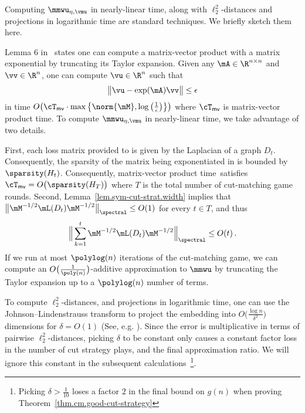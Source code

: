 \documentclass[letterpaper]{article}
\begin{document}
Computing $\mmwu_{\eta, \vmu}$ in nearly-linear time, along with $\ell_2^2$-distances and projections in logarithmic time are standard techniques. We briefly sketch them here.

Lemma 6 in~\cite{arora2007combinatorial} states one can compute a matrix-vector product with a matrix exponential by truncating its Taylor expansion. Given any $\mA \in \R^{n \times n}$ and $\vv \in \R^n$, one can compute $\vu \in \R^n$ such that
\begin{equation*}
\big\lVert \vu - \exp(\mA)\vv \big\rVert \leq \epsilon
\end{equation*}
in time $O \big( \cT_{\textsf{mv}} \cdot \max \big\{ \norm{\mM}, \log \big(\frac{1}{\epsilon} \big) \big\} \big)$ where $\cT_{\textsf{mv}}$ is matrix-vector product time. To compute $\mmwu_{\eta, \vmu}$ in nearly-linear time, we take advantage of two details.

First, each loss matrix provided to \mmwu is given by the Laplacian of a graph $D_t$. Consequently, the sparsity of the matrix being exponentiated in \mmwu is bounded by $\sparsity(H_t)$. Consequently, matrix-vector product time~satisfies $\cT_{\textsf{mv}} = O\big( \sparsity(H_T) \big)$ where $T$ is the total number of cut-matching game rounds. Second, Lemma~\ref{lem.sym-cut-strat.width} implies that $\big\lVert \mM^{-1/2} \mL(D_t) \mM^{-1/2} \big\rVert_{\spectral} \leq O(1)$ for every $t \in T$, and thus
\begin{equation*}
\Big\lVert \sum_{k=1}^t \mM^{-1/2} \mL(D_t) \mM^{-1/2} \Big\rVert_{\spectral} \leq O(t) \, .
\end{equation*}
If we run at most $\polylog(n)$ iterations of the cut-matching game, we can compute an $O \big( \frac{1}{\poly(n)} \big)$-additive approximation to $\mmwu$ by truncating the Taylor expansion up to a $\polylog(n)$ number of terms.

To compute $\ell_2^2$-distances, and projections in logarithmic time, one can use the Johnson--Lindenstrauss transform \cite{JohnsonLindenstraussOriginal} to project the embedding into $O\big( \frac{\log n}{\delta^2} \big)$ dimensions for $\delta = O(1)$ (See, e.g. \cite{dasgupta2003elementary,achlioptas2001database,blum2020foundations}). Since the error is multiplicative in terms of pairwise $\ell_2^2$-distances, picking $\delta$ to be constant only causes a constant factor loss in the number of cut strategy plays, and the final approximation ratio. We will ignore this constant in the subsequent calculations~\footnote{Picking $\delta > \frac{1}{10}$ loses a factor $2$ in the final bound on $g(n)$ when proving Theorem~\ref{thm.cm.good-cut-strategy}}.
\end{document}
